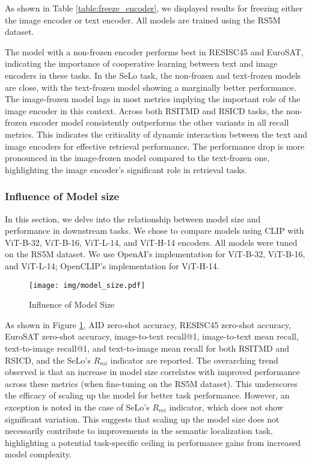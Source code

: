 \documentclass[journal]{IEEEtran}
\begin{document}
As shown in Table \ref{table:freeze_encoder}, we displayed results for freezing either the image encoder or text encoder. All models are trained using the RS5M dataset. 

The model with a non-frozen encoder performs best in RESISC45 and EuroSAT, indicating the importance of cooperative learning between text and image encoders in these tasks. In the SeLo task, the non-frozen and text-frozen models are close, with the text-frozen model showing a marginally better performance.
The image-frozen model lags in most metrics implying the important role of the image encoder in this context. Across both RSITMD and RSICD tasks, the non-frozen encoder model consistently outperforms the other variants in all recall metrics. This indicates the criticality of dynamic interaction between the text and image encoders for effective retrieval performance. The performance drop is more pronounced in the image-frozen model compared to the text-frozen one, highlighting the image encoder's significant role in retrieval tasks.

\subsubsection{Influence of Model size}

In this section, we delve into the relationship between model size and performance in downstream tasks. We chose to compare models using CLIP with ViT-B-32, ViT-B-16, ViT-L-14, and ViT-H-14 encoders. All models were tuned on the RS5M dataset. We use OpenAI's implementation for ViT-B-32, ViT-B-16, and ViT-L-14; OpenCLIP's implementation for ViT-H-14.

\begin{figure}
    \centering
    \texttt{[image: img/model\_size.pdf]}
    \caption{Influence of Model Size}
    \label{fig:model_size}
\end{figure}

As shown in Figure \ref{fig:model_size}, AID zero-shot accuracy, RESISC45 zero-shot accuracy, EuroSAT zero-shot accuracy, image-to-text recall@1, image-to-text mean recall, text-to-image recall@1, and text-to-image mean recall for both RSITMD and RSICD, and the SeLo's $R_{mi}$ indicator are reported. 
The overarching trend observed is that an increase in model size correlates with improved performance across these metrics (when fine-tuning on the RS5M dataset). This underscores the efficacy of scaling up the model for better task performance. However, an exception is noted in the case of SeLo's $R_{mi}$ indicator, which does not show significant variation. This suggests that scaling up the model size does not necessarily contribute to improvements in the semantic localization task, highlighting a potential task-specific ceiling in performance gains from increased model complexity.
\end{document}
